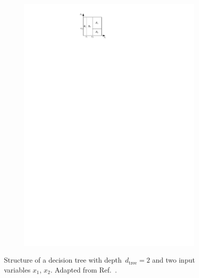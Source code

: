 \begin{figure}[htb]
\begin{subfigure}[t]{0.4\textwidth}
    \includegraphics{./figures/theory/decision_tree_partition.pdf}
    \label{fig:decision_tree_partition}
  \end{subfigure}
  \caption[Structure of a decision tree]{Structure of a decision tree with
    depth~$d_\text{tree} = 2$ and two input variables $x_1$, $x_2$. Adapted from
    Ref.~\cite{esl}.}
  \label{fig:decision_tree}
\end{figure}

